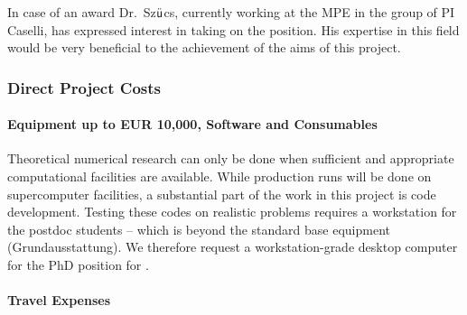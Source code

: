 \documentclass[10pt,fleqn,twoside]{article}
\begin{document}
In case of an award Dr.\ Sz$\ddot{\textsf u}$cs, currently working at
the MPE in the group of PI Caselli, has expressed interest in taking on the position. His expertise in this field would be very beneficial to the achievement of the aims of this project.

\subsubsection{Direct Project Costs}


\paragraph{Equipment up to EUR 10,000, Software and Consumables}

Theoretical numerical research can only be done when sufficient and
appropriate computational facilities are available. While production
runs will be done on supercomputer facilities, a substantial part of
the work in this project is code development. Testing these codes on
realistic problems requires a workstation for the postdoc
students -- which is beyond the standard base equipment
(Grundausstattung). We therefore request a workstation-grade desktop
computer for the PhD position for .

\paragraph{Travel Expenses}

% 
\end{document}
